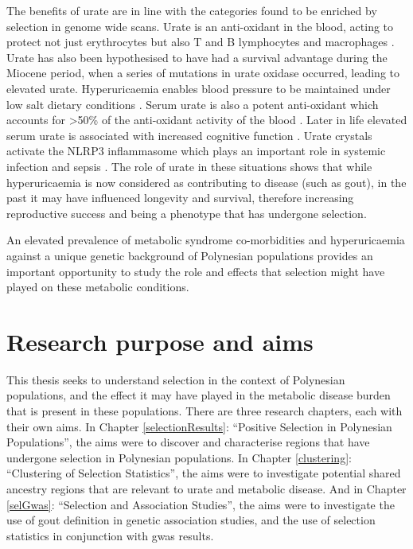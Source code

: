 \documentclass[]{report}
\begin{document}
The benefits of urate are in line with the categories found to be
enriched by selection in genome wide scans. Urate is an anti-oxidant in
the blood, acting to protect not just erythrocytes but also T and B
lymphocytes and macrophages \citep{Ames1981}. Urate has also been
hypothesised to have had a survival advantage during the Miocene period,
when a series of mutations in urate oxidase occurred, leading to
elevated urate. Hyperuricaemia enables blood pressure to be maintained
under low salt dietary conditions \citep{Watanabe2002}. Serum urate is
also a potent anti-oxidant which accounts for \textgreater{}50\% of the
anti-oxidant activity of the blood \citep{Glantzounis2005, Parmar2009}.
Later in life elevated serum urate is associated with increased
cognitive function \citep{Euser2009}. Urate crystals activate the NLRP3
inflammasome which plays an important role in systemic infection and
sepsis \citep{Opitz2009}. The role of urate in these situations shows
that while hyperuricaemia is now considered as contributing to disease
(such as gout), in the past it may have influenced longevity and
survival, therefore increasing reproductive success and being a
phenotype that has undergone selection.

An elevated prevalence of metabolic syndrome co-morbidities and
hyperuricaemia against a unique genetic background of Polynesian
populations provides an important opportunity to study the role and
effects that selection might have played on these metabolic conditions.

\section{Research purpose and aims}\label{research-purpose-and-aims}

This thesis seeks to understand selection in the context of Polynesian
populations, and the effect it may have played in the metabolic disease
burden that is present in these populations. There are three research
chapters, each with their own aims. In Chapter \ref{selectionResults}:
``Positive Selection in Polynesian Populations'', the aims were to
discover and characterise regions that have undergone selection in
Polynesian populations. In Chapter \ref{clustering}: ``Clustering of
Selection Statistics'', the aims were to investigate potential shared
ancestry regions that are relevant to urate and metabolic disease. And
in Chapter \ref{selGwas}: ``Selection and Association Studies'', the
aims were to investigate the use of gout definition in genetic
association studies, and the use of selection statistics in conjunction
with \gls{gwas} results.
\end{document}
